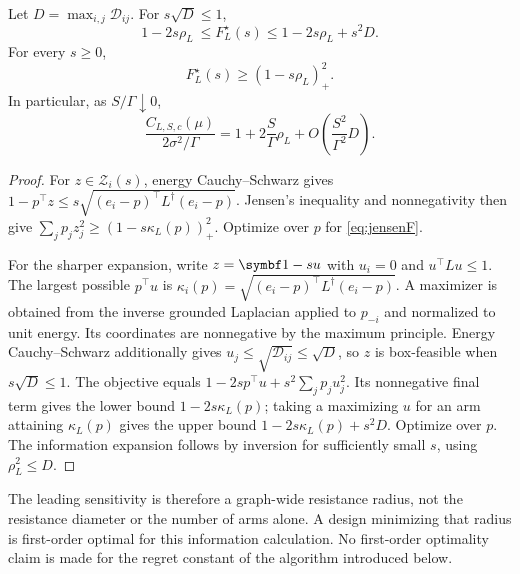 \begin{theorem}
Let $D=\max_{i,j}\mathcal D_{ij}$. For $s\sqrt D\le1$,
\begin{equation}
 1-2s\rho_L\ \le F_L^\star(s)
 \le 1-2s\rho_L+s^2D.
 \label{eq:firstorderF}
\end{equation}
For every $s\ge0$,
\begin{equation}
 F_L^\star(s)\ge(1-s\rho_L)_+^2.
 \label{eq:jensenF}
\end{equation}
In particular, as $S/\Gamma\downarrow0$,
\begin{equation}
 \frac{C_{L,S,c}(\mu)}{2\sigma^2/\Gamma}
 =1+2\frac S\Gamma\rho_L
   +O\!\left(\frac{S^2}{\Gamma^2}D\right).
 \label{eq:sensitivity}
\end{equation}
\label{thm:sensitivity}
\end{theorem}
\begin{proof}
For $z\in\mathcal Z_i(s)$, energy Cauchy--Schwarz gives
$1-p^\top z\le s\sqrt{(e_i-p)^\top L^\dagger(e_i-p)}$.
Jensen's inequality and nonnegativity then give
$\sum_jp_jz_j^2\ge(1-s\kappa_L(p))_+^2$. Optimize over $p$ for \eqref{eq:jensenF}.

For the sharper expansion, write $z=\one-su$ with $u_i=0$ and $u^\top Lu\le1$. The largest possible $p^\top u$ is $\kappa_i(p)=\sqrt{(e_i-p)^\top L^\dagger(e_i-p)}$. A maximizer is obtained from the inverse grounded Laplacian applied to $p_{-i}$ and normalized to unit energy. Its coordinates are nonnegative by the maximum principle. Energy Cauchy--Schwarz additionally gives $u_j\le\sqrt{\mathcal D_{ij}}\le\sqrt D$, so $z$ is box-feasible when $s\sqrt D\le1$. The objective equals $1-2sp^\top u+s^2\sum_jp_ju_j^2$. Its nonnegative final term gives the lower bound $1-2s\kappa_L(p)$; taking a maximizing $u$ for an arm attaining $\kappa_L(p)$ gives the upper bound $1-2s\kappa_L(p)+s^2D$. Optimize over $p$. The information expansion follows by inversion for sufficiently small $s$, using $\rho_L^2\le D$.
\end{proof}
The leading sensitivity is therefore a graph-wide resistance radius, not the resistance diameter or the number of arms alone. A design minimizing that radius is first-order optimal for this information calculation. No first-order optimality claim is made for the regret constant of the algorithm introduced below.

